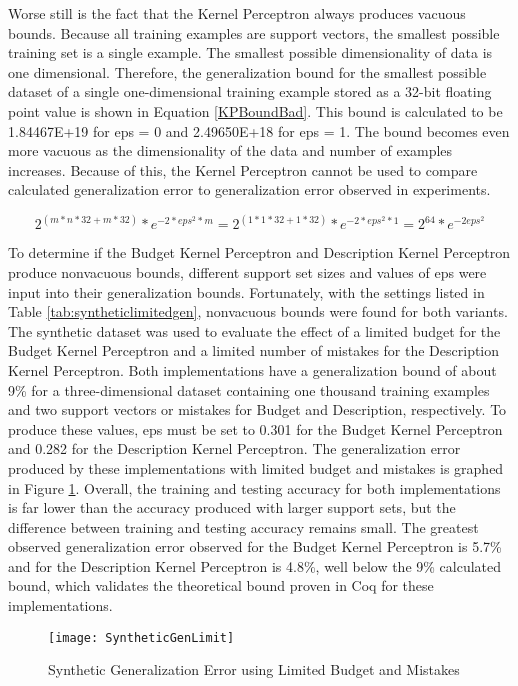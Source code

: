 Worse still is the fact that the Kernel Perceptron always produces vacuous bounds. Because all training examples are support vectors, the smallest possible training set is a single example. The smallest possible dimensionality of data is one dimensional. Therefore, the generalization bound for the smallest possible dataset of a single one-dimensional training example stored as a 32-bit floating point value is shown in Equation \ref{KPBoundBad}. This bound is calculated to be 1.84467E+19 for eps = 0 and 2.49650E+18 for eps = 1. The bound becomes even more vacuous as the dimensionality of the data and number of examples increases. Because of this, the Kernel Perceptron cannot be used to compare calculated generalization error to generalization error observed in experiments.

\begin{equation} \label{KPBoundBad}
 2^{(m*n*32 + m*32)} * e^{-2*eps^{2}*m} = 2^{(1*1*32 + 1*32)} * e^{-2*eps^{2}*1} = 2^{64}*e^{-2eps^{2}}
\end{equation}

To determine if the Budget Kernel Perceptron and Description Kernel Perceptron produce nonvacuous bounds, different support set sizes and values of eps were input into their generalization bounds. Fortunately, with the settings listed in Table \ref{tab:syntheticlimitedgen}, nonvacuous bounds were found for both variants. The synthetic dataset was used to evaluate the effect of a limited budget for the Budget Kernel Perceptron and a limited number of mistakes for the Description Kernel Perceptron. Both implementations have a generalization bound of about 9\% for a three-dimensional dataset containing one thousand training examples and two support vectors or mistakes for Budget and Description, respectively. To produce these values, eps must be set to 0.301 for the Budget Kernel Perceptron and 0.282 for the Description Kernel Perceptron. The generalization error produced by these implementations with limited budget and mistakes is graphed in Figure \ref{SyntheticGenErr2Fig}. Overall, the training and testing accuracy for both implementations is far lower than the accuracy produced with larger support sets, but the difference between training and testing accuracy remains small. The greatest observed generalization error observed for the Budget Kernel Perceptron is 5.7\% and for the Description Kernel Perceptron is 4.8\%, well below the 9\% calculated bound, which validates the theoretical bound proven in Coq for these implementations.

\begin{figure}[h]\label{SyntheticGenErr2Fig}
 \caption{Synthetic Generalization Error using Limited Budget and Mistakes}
 \begin{center}
  \texttt{[image: SyntheticGenLimit]} 
 \end{center}
\end{figure}

